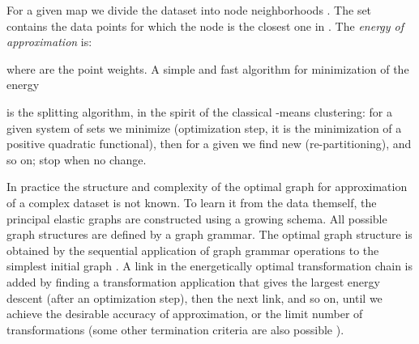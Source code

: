 \documentclass[graybox]{archivesofdatascience}
\begin{document}
For a given map  we divide the dataset  into
node neighborhoods . The set  contains the data points for
which the node  is the closest one in . The {\it
energy of approximation} is:

where  are the point weights. A simple and fast algorithm for minimization of the energy




\noindent is the splitting algorithm, in the spirit of the classical -means clustering: for a given
system of sets  we minimize  (optimization step, it
is the minimization of a positive quadratic functional), then for a
given  we find new  (re-partitioning), and so on; stop when no change.

\iffalse
The next problem is the elastic graph construction. Here we should
find a compromise between simplicity of graph topology, simplicity
of geometrical form for a given topology, and accuracy of
approximation \citep{zinovyev2013data}. Geometrical complexity is measured by the graph
energy , and the error of approximation is measured
by the energy of approximation . Both are
included in the energy . Topological or construction complexity will be
represented by means of elementary transformations: it is the
length of the energetically optimal chain of elementary
transformation from a given set applied to initial simple graph.

The graph grammars \citep{Nagl,Loewe} provide a well-developed
formalism for the description of elementary graph transformations. An
elastic graph grammar is presented as a set of production (or
substitution) rules. Each rule has a form , where  and
 are elastic graphs. When this rule is applied to an elastic
graph, a copy of  is removed from the graph together with all its
incident edges and is replaced with a copy of  with edges that
connect  to graph. For a full description of this language we
need the notion of a {\it labeled graph}. Labels are necessary to
provide the proper connection between  and the graph.
\fi

In practice the structure and complexity of the optimal graph for
approximation of a complex dataset is not known.
To learn it from the data themself, the principal elastic graphs
are constructed using a growing schema. All possible graph
structures are defined by a graph grammar. The optimal graph structure is obtained by the sequential application
of graph grammar operations to
the simplest initial graph \citep{gorban2007topological}. A link in the energetically optimal transformation chain is
added by finding a transformation application that gives the
largest energy descent (after an optimization step), then the next
link, and so on, until we achieve the desirable accuracy of
approximation, or the limit number of transformations (some other
termination criteria are also possible \citep{zinovyev2013data}).
\end{document}
